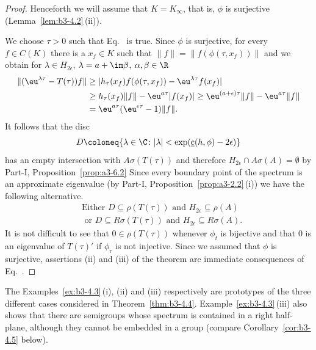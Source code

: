 \begin{proof}
	Henceforth we will assume that $K = K_{\infty}$, that is, $\phi$ is surjective (\cf Lemma~\ref{lem:b3-4.2}\,(ii)).
	
	We choose $\tau > 0$ such that Eq.~ is true.
	Since $\phi$ is surjective, for every $f \in C(K)$ there is a $x_{f} \in K$ such that $\|f\| = \|f(\phi(\tau,x_{f}))\|$ and we obtain for $\lambda \in H_{2\epsilon}$, $\lambda = a + \im\beta$, $\alpha,\beta \in \R$
	\begin{equation}\label{eq:b3-4.9}
		\begin{aligned}
			\|(\eu^{\lambda\tau} - T(\tau))f\| &\geq |h_{\tau}(x_{f})f(\phi(\tau,x_{f})) - \eu^{\lambda\tau}f(x_{f})| \\
			& \geq h_{\tau}(x_{f})\|f\| - \eu^{a\tau}|f(x_{f})| 
			 \geq \eu^{(a+\epsilon)\tau}\|f\| - \eu^{a\tau}\|f\| \\
			&= \eu^{a\tau}(\eu^{\epsilon\tau} - 1)\|f\|.
		\end{aligned}
	\end{equation}
	It follows that the disc 
    \[
    D \coloneq \{\lambda \in \C \colon |\lambda| < \exp(\underbar{c}(h,\phi)-2\epsilon)\}
    \]
    has an empty intersection with $A{\sigma}(T(\tau))$ and therefore $H_{2\epsilon}\cap A\sigma(A) = \emptyset$ by Part-I, Proposition~\ref{prop:a3-6.2}
	Since every boundary point of the spectrum is an approximate eigenvalue (by Part-I, Proposition~\ref{prop:a3-2.2}\,(i)) we have the following alternative.
	\begin{equation}\label{eq:b3-4.10}
		\begin{aligned}
		&\text{Either } D \subseteq \rho(T(\tau)) \text{ and } H_{2\epsilon} \subseteq \rho(A) \\
		&\text{ or } D \subseteq R{\sigma}(T(\tau)) \text{ and } H_{2\epsilon} \subseteq R{\sigma}(A).
	\end{aligned}
	\end{equation}
	It is not difficult to see that $0 \in \rho(T(\tau))$ whenever $\phi_{t}$ is bijective and that $0$ is an eigenvalue of\/ $T(\tau)'$ if\/ $\phi_{\tau}$ is not injective.
	Since we assumed that $\phi$ is surjective, assertions (ii) and (iii) of the theorem are immediate consequences of Eq.~.
\end{proof}
The Examples~\ref{ex:b3-4.3}\,(i), (ii) and (iii) respectively are prototypes of the three different cases considered in Theorem~\ref{thm:b3-4.4}.
Example~\ref{ex:b3-4.3}\,(iii) also shows that there are semigroups whose spectrum is contained in a right half-plane, although they cannot be embedded in a group (compare Corollary~\ref{cor:b3-4.5} below).
